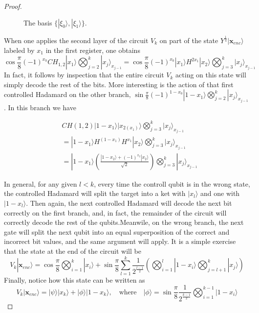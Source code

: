 \documentclass{article}
\theoremstyle{definition}
\newcommand{\ket}[1]{|#1\rangle}
\begin{document}
\begin{proof}
\begin{figure}[t]
\centering
{}
\caption{The basis $\{\ket{\xi_0}, \ket{\xi_1}\}$.}
\label{fig:bases}
\end{figure}

When one applies the second layer of the circuit $V_k$ on part of the state $Y^{\frac{1}{4}}\ket{\textbf{x}_{enc}}$ labeled by $x_1$ in the first register, one obtains 
\[\cos\frac{\pi}{8}(-1)^{x_0}CH_{1,2}\ket{x_1}\bigotimes_{j=2}^k\ket{x_j}_{x_{j-1}}=\cos\frac{\pi}{8}(-1)^{x_0}\ket{x_1}H^{2 x_1}\ket{x_2}\bigotimes_{j=3}^k\ket{x_j}_{x_{j-1}}\]
In fact, it follows by inspection that the entire circuit $V_k$ acting on this state will simply decode the rest of the bits. More interesting is the action of that first controlled Hadamard on the other branch, $\sin\frac{\pi}{8}(-1)^{1-x_0}\ket{1-x_1}\bigotimes_{j=2}^k\ket{x_j}_{x_{j-1}}$. In this branch we have

\begin{eqnarray}
&CH(1,2)\ket{1-x_1}\ket{x_{2(x_1)}}\bigotimes_{j=3}^k\ket{x_j}_{x_{j-1}}\\
&=\ket{1-x_1}H^{(1-x_1)}H^{x_1}\ket{x_2}\bigotimes_{j=3}^k\ket{x_j}_{x_{j-1}}\\
&=\ket{1-x_1}\left(\frac{\ket{1-x_2}+(-1)^{x_2}\ket{x_2}}{\sqrt2}\right)\bigotimes_{j=3}^k\ket{x_j}_{x_{j-1}}
\end{eqnarray}

In general, for any given $l<k$, every time the controll qubit is in the wrong state, the controlled Hadamard will split the target into a ket with $\ket{x_l}$ and one with $\ket{1-x_l}$. Then again, the next controlled Hadamard will decode the next bit correctly on the first branch, and, in fact, the remainder of the circuit will correctly decode the rest of the qubits.Meanwile, on the wrong branch, the next gate will split the next qubit into an equal superposition of the correct and incorrect bit values, and the same argument will apply. It is a simple exercise that the state at the end of the circuit will be
\begin{equation}
V_k\ket{\textbf{x}_{enc}}=\cos\frac{\pi}{8}\bigotimes_{i=1}^k\ket{x_i}+\sin\frac{\pi}{8}\sum_{l=1}^k\frac{1}{2^{\frac{l-1}{2}}}\left(\bigotimes_{i=1}^l\ket{1-x_i}\bigotimes_{j=l+1}^k\ket{x_j}\right)
\end{equation}
Finally, notice how this state can be written as
\[V_k\ket{\textbf{x}_{enc}}=\ket{\psi}\ket{x_k}+\ket{\phi}\ket{1-x_k},\quad \text{where} \quad \ket{\phi}=\sin\frac{\pi}{8}\frac{1}{2^{\frac{k-1}{2}}}\bigotimes_{i=1}^{k-1}\ket{1-x_i}\]

\end{proof}
\end{document}
